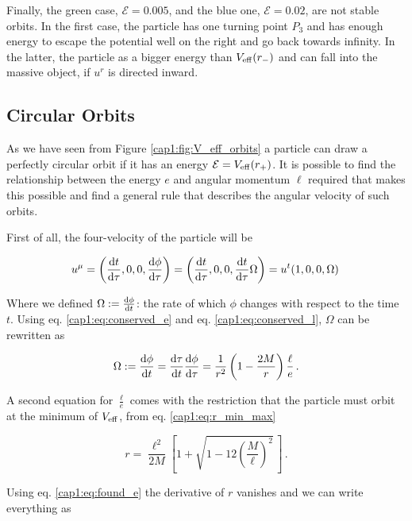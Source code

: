 Finally, the green case, $\mathcal E = 0.005$, and the blue one,
$\mathcal E = 0.02$, are not stable orbits.
In the first case, the particle has one turning point $P_3$ and has enough
energy to escape the potential well on the right and go back towards infinity.
In the latter, the particle as a bigger energy than $V_{\rm eff} (r_-)$
and can fall into the massive object, if $u^r$ is directed inward.


\subsection{Circular Orbits}
\label{cap1:ssec:circular_orbits}

As we have seen from Figure \ref{cap1:fig:V_eff_orbits} a particle can draw a
perfectly circular orbit if it has an energy $\mathcal E = V_{\rm eff}(r_+)$.
It is possible to find the relationship between the energy $e$
and angular momentum $\ell$ required that makes this possible and find a
general rule that describes the angular velocity of such orbits.

First of all, the four-velocity of the particle will be

\begin{equation}
    u^\mu = \left(\dv{t}{\tau}, 0, 0, \dv{\phi}{\tau} \right)
    = \left(\dv{t}{\tau}, 0, 0, \dv{t}{\tau} \Omega \right)
    = u^t (1, 0, 0, \Omega) \,
    \label{cap1:eq:circular_orbit_u}
\end{equation}

Where we defined $\Omega := \dv{\phi}{t}$: the rate of which $\phi$ changes with
respect to the \Sh time $t$.
Using eq. \ref{cap1:eq:conserved_e} and eq. \ref{cap1:eq:conserved_l}, $\Omega$
can be rewritten as

\begin{equation}
    \Omega := \dv{\phi}{t} = \dv{\tau}{t} \dv{\phi}{\tau} =
    \frac{1}{r^2} \left(1 - \frac{2M}{r} \right) \frac{\ell}{e}\, .
    \label{cap1:eq:Omega}
\end{equation}

A second equation for $\frac{\ell}{e}$ comes with the restriction that the
particle must orbit at the minimum of $V_{\rm eff}$, from eq.
\ref{cap1:eq:r_min_max}

\begin{equation}
    r = \frac{\ell^2}{2 M} \left[1 +
    \sqrt{1 - 12 \left( \frac{M}{\ell} \right)^2} \, \right] \, .
    \label{cap1:eq:r_min}
\end{equation}

Using eq. \ref{cap1:eq:found_e} the derivative of $r$ vanishes
and we can write everything as

